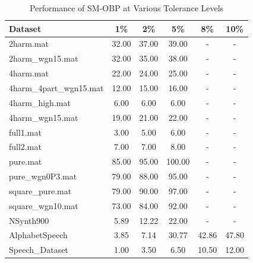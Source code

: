 \documentclass{ieeeaccess}
\begin{document}
\begin{table}[h!]
\centering
\begin{tabular}{lccccc}
\hline
\textbf{Dataset} & \textbf{1\%} & \textbf{2\%} & \textbf{5\%} & \textbf{8\%} & \textbf{10\%} \\ \hline
2harm.mat & 32.00 & 37.00 & 39.00 & - & - \\ 
2harm\_wgn15.mat & 32.00 & 35.00 & 38.00 & - & - \\ 
4harm.mat & 22.00 & 24.00 & 25.00 & - & - \\ 
4harm\_4part\_wgn15.mat & 12.00 & 15.00 & 16.00 & - & - \\ 
4harm\_high.mat & 6.00 & 6.00 & 6.00 & - & - \\ 
4harm\_wgn15.mat & 19.00 & 21.00 & 22.00 & - & - \\ 
full1.mat & 3.00 & 5.00 & 6.00 & - & - \\ 
full2.mat & 7.00 & 7.00 & 8.00 & - & - \\ 
pure.mat & 85.00 & 95.00 & 100.00 & - & - \\ 
pure\_wgn0P3.mat & 79.00 & 88.00 & 95.00 & - & - \\ 
square\_pure.mat & 79.00 & 90.00 & 97.00 & - & - \\ 
square\_wgn10.mat & 73.00 & 84.00 & 92.00 & - & - \\ 
NSynth900 & 5.89 & 12.22 & 22.00 & - & - \\ 
AlphabetSpeech & 3.85 & 7.14 & 30.77 & 42.86 & 47.80 \\ 
Speech\_Dataset & 1.00 & 3.50 & 6.50 & 10.50 & 12.00 \\ \hline
\end{tabular}
\caption{Performance of SM-OBP at Various Tolerance Levels}
\label{tab:SMOBP_performance}
\end{table}
\end{document}
